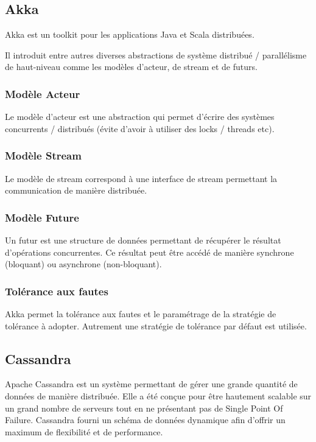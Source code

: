 \documentclass[a4paper, 11pt, titlepage]{article}
\begin{document}
\newpage
\subsection {Akka}

Akka est un toolkit pour les applications Java et Scala distribuées.

\noindent Il introduit entre autres diverses abstractions de système distribué / parallélisme de haut-niveau comme les modèles d'acteur, de stream et de futurs.


\subsubsection {Modèle Acteur}

Le modèle d'acteur est une abstraction qui permet d'écrire des systèmes concurrents / distribués (évite d'avoir à utiliser des locks / threads etc).


\subsubsection {Modèle Stream}

Le modèle de stream correspond à une interface de stream permettant la communication de manière distribuée.


\subsubsection {Modèle Future}

Un futur est une structure de données permettant de récupérer le résultat d'opérations concurrentes.
Ce résultat peut être accédé de manière synchrone (bloquant) ou asynchrone (non-bloquant).



\subsubsection* {Tolérance aux fautes}

Akka permet la tolérance aux fautes et le paramétrage de la stratégie de tolérance à adopter. Autrement une stratégie de tolérance par défaut est utilisée.



\newpage
\subsection {Cassandra}

Apache Cassandra est un système permettant de gérer une grande quantité de données de manière distribuée. Elle a été conçue pour être hautement scalable sur un grand nombre de serveurs tout en ne présentant pas de Single Point Of Failure.
Cassandra fourni un schéma de données dynamique afin d'offrir un maximum de flexibilité et de performance.
\end{document}
